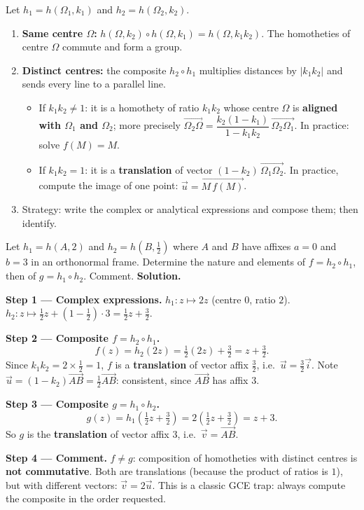 \documentclass[11pt]{article}
\newcounter{popsec}
\newcounter{popsub}
\newcommand{\courssub}[1]{%
  \stepcounter{popsub}%
  \par\vspace{9pt}\noindent{\popxbold\fontsize{11.5}{13}\selectfont\color{popink}{\color{poporange}\thepopsec.\thepopsub}\hspace{6pt}#1}\par\nopagebreak\vspace{4pt}
}
\begin{document}
\courssub{Composing two homotheties}

\begin{methode}
Let $h_1 = h(\Omega_1, k_1)$ and $h_2 = h(\Omega_2, k_2)$.
\begin{enumerate}
\item \textbf{Same centre $\Omega$:} $h(\Omega, k_2) \circ h(\Omega, k_1) = h(\Omega, k_1 k_2)$. The homotheties of centre $\Omega$ commute and form a group.
\item \textbf{Distinct centres:} the composite $h_2 \circ h_1$ multiplies distances by $|k_1 k_2|$ and sends every line to a parallel line.
\begin{itemize}
\item If $k_1 k_2 \neq 1$: it is a homothety of ratio $k_1 k_2$ whose centre $\Omega$ is \textbf{aligned with $\Omega_1$ and $\Omega_2$}; more precisely $\overrightarrow{\Omega_2 \Omega} = \dfrac{k_2(1-k_1)}{1 - k_1k_2}\,\overrightarrow{\Omega_2\Omega_1}$. In practice: solve $f(M) = M$.
\item If $k_1 k_2 = 1$: it is a \textbf{translation} of vector $(1 - k_2)\,\overrightarrow{\Omega_1 \Omega_2}$. In practice, compute the image of one point: $\vec{u} = \overrightarrow{M\,f(M)}$.
\end{itemize}
\item Strategy: write the complex or analytical expressions and compose them; then identify.
\end{enumerate}
\end{methode}

\begin{exoresolu}
Let $h_1 = h(A, 2)$ and $h_2 = h(B, \tfrac12)$ where $A$ and $B$ have affixes $a = 0$ and $b = 3$ in an orthonormal frame. Determine the nature and elements of $f = h_2 \circ h_1$, then of $g = h_1 \circ h_2$. Comment.
\tcblower
\textbf{Solution.}

\textbf{Step 1 — Complex expressions.} $h_1 : z \mapsto 2z$ (centre $0$, ratio $2$). $h_2 : z \mapsto \frac12 z + (1-\frac12)\cdot 3 = \frac12 z + \frac32$.

\textbf{Step 2 — Composite $f = h_2 \circ h_1$.}
\[ f(z) = h_2(2z) = \tfrac12 (2z) + \tfrac32 = z + \tfrac32. \]
Since $k_1 k_2 = 2 \times \frac12 = 1$, $f$ is a \textbf{translation} of vector affix $\frac32$, i.e.\ $\vec{u} = \frac32\vec{i}$. Note $\vec{u} = (1-k_2)\overrightarrow{AB} = \frac12 \overrightarrow{AB}$: consistent, since $\overrightarrow{AB}$ has affix $3$.

\textbf{Step 3 — Composite $g = h_1 \circ h_2$.}
\[ g(z) = h_1\!\left(\tfrac12 z + \tfrac32\right) = 2\left(\tfrac12 z + \tfrac32\right) = z + 3. \]
So $g$ is the \textbf{translation} of vector affix $3$, i.e.\ $\vec{v} = \overrightarrow{AB}$.

\textbf{Step 4 — Comment.} $f \neq g$: composition of homotheties with distinct centres is \textbf{not commutative}. Both are translations (because the product of ratios is $1$), but with different vectors: $\vec{v} = 2\vec{u}$. This is a classic GCE trap: always compute the composite in the order requested.
\end{exoresolu}
\end{document}
